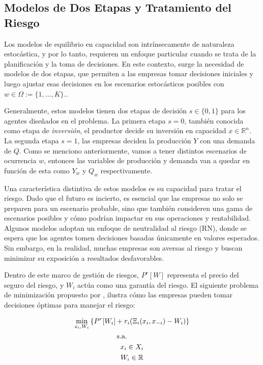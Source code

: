 \subsection{Modelos de Dos Etapas y Tratamiento del Riesgo}\label{C29}

Los modelos de equilibrio en capacidad son intrínsecamente de naturaleza estocástica, y por lo tanto, requieren un enfoque particular cuando se trata de la planificación y la toma de decisiones. En este contexto, surge la necesidad de modelos de dos etapas, que permiten a las empresas tomar decisiones iniciales y luego ajustar esas decisiones en los escenarios estocásticos posibles con $w \in \Omega:=\{1,...,K\}$..

\vspace{2.5mm}
Generalmente, estos modelos tienen dos etapas de decisión $s\in\{0,1\}$ para los agentes diseñados en el problema. La primera etapa $s=0$, también conocida como etapa de \textit{inversión}, el productor decide su inversión en capacidad $x \in \mathbb{R}^{n}$. La segunda etapa $s=1$, las empresas deciden la producción $Y$ con una demanda de $Q$. Como se menciono anteriormente, vamos a tener distintos escenarios de ocurrencia $w$, entonces las variables de producción y demanda van a quedar en función de esta como $Y_{w}$ y $Q_{w}$ respectivamente.

\vspace{2.5mm}
Una característica distintiva de estos modelos es su capacidad para tratar el riesgo. Dado que el futuro es incierto, es esencial que las empresas no solo se preparen para un escenario probable, sino que también consideren una gama de escenarios posibles y cómo podrían impactar en sus operaciones y rentabilidad. Algunos modelos adoptan un enfoque de neutralidad al riesgo (RN), donde se espera que los agentes tomen decisiones basadas únicamente en valores esperados. Sin embargo, en la realidad, muchas empresas son aversas al riesgo y buscan minimizar su exposición a resultados desfavorables.

\vspace{2.5mm}
Dentro de este marco de gestión de riesgos, \( P^r[W] \) representa el precio del seguro del riesgo, y \( W_i \) actúa como una garantía del riesgo. El siguiente problema de minimización propuesto por , ilustra cómo las empresas pueden tomar decisiones óptimas para manejar el riesgo:


\begin{gather}
\min_{x_i, W_i} \left\{ P^r[W_i] + r_i(\Xi_i(x_i, x_{-i}) - W_i) \right\} \label{c291} \\
\hspace*{-1cm}\textrm{s.a.} \notag \\
x_i \in X_i \notag  \\ 
W_i \in \mathbb{R} \notag 
\end{gather}



